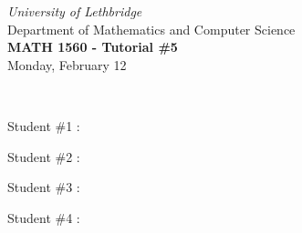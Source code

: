 \documentclass[12pt]{article}
\newcommand{\skipline}{\vspace{12pt}}
\begin{document}
\author{Instructor: Sean Fitzpatrick}
\thispagestyle{empty}
\begin{center}
\emph{University of Lethbridge}\\
Department of Mathematics and Computer Science\\
{\bf MATH 1560 - Tutorial \#5}\\
Monday, February 12
\end{center}
\skipline \ \noindent \skipline

Student \#1 :\underline{\hspace{348pt}}\\

\bigskip


Student \#2 :\underline{\hspace{348pt}}\\

\bigskip

Student \#3 :\underline{\hspace{348pt}}\\

\bigskip

Student \#4 :\underline{\hspace{348pt}}\\


\bigskip


\bigskip


\bigskip
\end{document}

